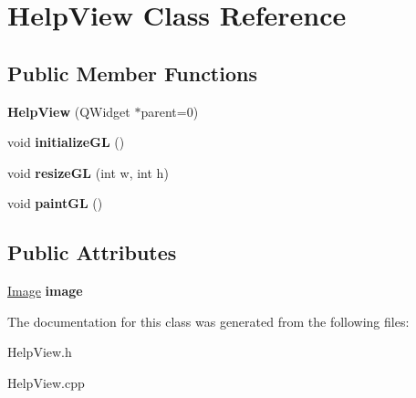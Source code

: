 \hypertarget{classHelpView}{\section{\-Help\-View \-Class \-Reference}
\label{classHelpView}
}
\subsection*{\-Public \-Member \-Functions}
\begin{DoxyCompactItemize}
\item 
\hypertarget{classHelpView_af5818649522a7ab3da2e122fc42b75d9}{{\bfseries \-Help\-View} (\-Q\-Widget $\ast$parent=0)}\label{classHelpView_af5818649522a7ab3da2e122fc42b75d9}

\item 
\hypertarget{classHelpView_a0f4cc7dc6856ed9bcdef5f1e9aad045a}{void {\bfseries initialize\-G\-L} ()}\label{classHelpView_a0f4cc7dc6856ed9bcdef5f1e9aad045a}

\item 
\hypertarget{classHelpView_a0519a15d2888e1033125be9df935a222}{void {\bfseries resize\-G\-L} (int w, int h)}\label{classHelpView_a0519a15d2888e1033125be9df935a222}

\item 
\hypertarget{classHelpView_a9fc12cd0260bc5eb94d2c9e156f523c9}{void {\bfseries paint\-G\-L} ()}\label{classHelpView_a9fc12cd0260bc5eb94d2c9e156f523c9}

\end{DoxyCompactItemize}
\subsection*{\-Public \-Attributes}
\begin{DoxyCompactItemize}
\item 
\hypertarget{classHelpView_a7a2f148e6a22a67529b829b796504fba}{\hyperlink{classImage}{\-Image} {\bfseries image}}\label{classHelpView_a7a2f148e6a22a67529b829b796504fba}

\end{DoxyCompactItemize}


\-The documentation for this class was generated from the following files\-:\begin{DoxyCompactItemize}
\item 
\-Help\-View.\-h\item 
\-Help\-View.\-cpp\end{DoxyCompactItemize}
